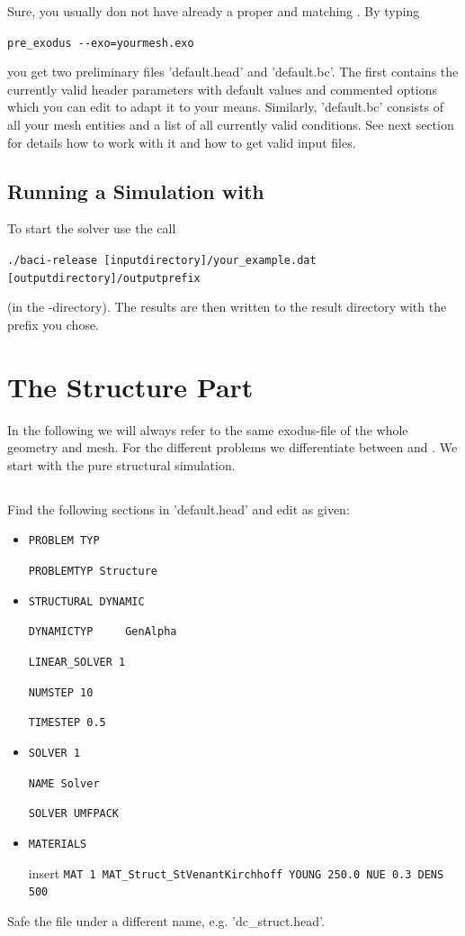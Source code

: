 Sure, you usually don not have already a proper \head and matching \bc. By
typing
\begin{center}
  \verb|pre_exodus --exo=yourmesh.exo|
\end{center}
you get two preliminary files
'default.head' and 'default.bc'. The first contains the currently valid header
parameters with default values and commented options which you can edit to
adapt it to your means. Similarly, 'default.bc' consists of all your mesh
entities and a list of all currently valid conditions. See next section for
details how to work with it and how to get valid input files.

\subsection{Running a Simulation with \baci{}}
\label{tut_fsi_preexo:baci}
To start the solver use the call 
\begin{center}
	\verb|./baci-release [inputdirectory]/your_example.dat [outputdirectory]/outputprefix|
\end{center}
(in the \baci{}-directory). The results are then written to
the result directory with the prefix you chose.

\section{The Structure Part}

In the following we will always refer to the same exodus-file of the whole
geometry and mesh. For the different problems we differentiate between \head and
\bc. We start with the pure structural simulation.

\subsection{\head}
Find the following sections in 'default.head' and edit as given:

\begin{itemize}
 \item \verb|PROBLEM TYP|

 \verb|PROBLEMTYP Structure|

 \item \verb|STRUCTURAL DYNAMIC|

 \verb|DYNAMICTYP     GenAlpha|

 \verb|LINEAR_SOLVER 1|

 \verb|NUMSTEP 10|

 \verb|TIMESTEP 0.5|

 \item \verb|SOLVER 1|
 
 \verb|NAME Solver|

 \verb|SOLVER UMFPACK|

 \item \verb|MATERIALS|

  insert \verb|MAT 1 MAT_Struct_StVenantKirchhoff YOUNG 250.0 NUE 0.3 DENS 500|
 
\end{itemize}
Safe the file under a different name, e.g. 'dc\_struct.head'.


